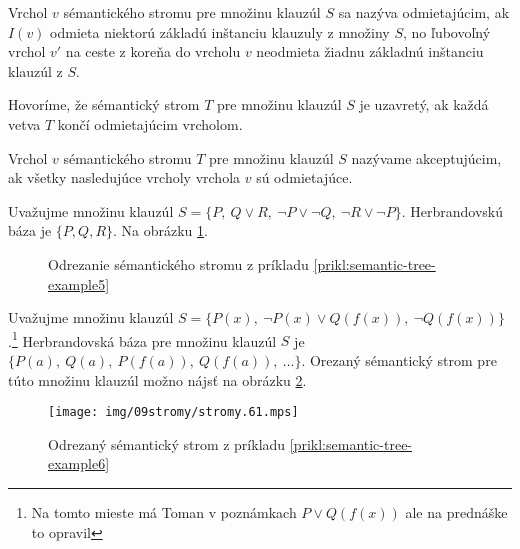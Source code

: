 \begin{definicia}
    Vrchol $v$ sémantického stromu pre množinu klauzúl $S$ sa
    nazýva odmietajúcim, ak  $I(v)$ odmieta niektorú základú inštanciu
    klauzuly z množiny $S$, no ľubovoľný vrchol $v'$  na ceste z koreňa 
    do vrcholu $v$
    neodmieta žiadnu základnú inštanciu klauzúl z $S$.
\end{definicia}

\begin{definicia}
    Hovoríme, že sémantický strom $T$ pre množinu klauzúl $S$
    je uzavretý, ak každá vetva $T$ končí odmietajúcim vrcholom.
\end{definicia}

\begin{definicia}
    Vrchol $v$ sémantického stromu $T$ pre  množinu klauzúl $S$ 
    nazývame akceptujúcim, ak všetky nasledujúce
    vrcholy vrchola $v$ sú odmietajúce.
\end{definicia}

\begin{priklad}
    \label{prikl:semantic-tree-example5}
    Uvažujme množinu klauzúl
    $S= \{ P,\ Q \lor R,\ \neg P \lor \neg Q,\ \neg R \lor \neg P \}$.
    Herbrandovskú báza je $\{P, Q, R\}$. Na obrázku
    \ref{fig:semantic-tree-example5}.

    \begin{figure}[h]
        \centering
        \caption{Odrezanie sémantického stromu z príkladu
                \ref{prikl:semantic-tree-example5}}
        \label{fig:semantic-tree-example5}
    \end{figure}
\end{priklad}



\begin{priklad}
    \label{prikl:semantic-tree-example6}
    Uvažujme množinu klauzúl $S=\{ P(x),\ \neg P(x) \lor Q(f(x)),\ \neg Q(f(x)) \}$.\footnote{
        Na tomto mieste má Toman v poznámkach $P \lor Q(f(x))$ ale na
        prednáške to opravil}
    Herbrandovská báza pre množinu klauzúl $S$ je
    $\{ P(a),\ Q(a),\ P(f(a)),\ Q(f(a)),\ \ldots \}$. Orezaný sémantický
    strom pre túto množinu klauzúl možno nájsť na obrázku
    \ref{fig:semantic-tree-example6}.

    \begin{figure}[h]
        \centering
        \texttt{[image: img/09stromy/stromy.61.mps]}
        \caption{Odrezaný sémantický strom z príkladu
                \ref{prikl:semantic-tree-example6}}
        \label{fig:semantic-tree-example6}
    \end{figure}
\end{priklad}


